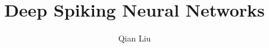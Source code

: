 \documentclass[12pt,PhD,twoside]{muthesis}
\begin{document}

\title{Deep Spiking Neural Networks} %
\author{Qian Liu}

\beforeabstract



{}














%

\end{document}
